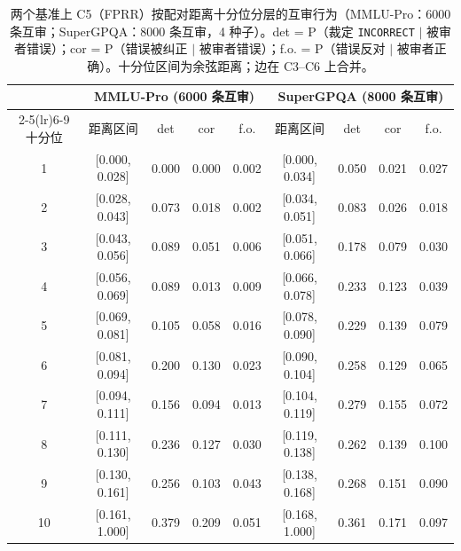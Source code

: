\documentclass[UTF8,11pt]{ctexart}
\begin{document}
\begin{table}[t]
\centering
\small
\caption{两个基准上 C5（FPRR）按配对距离十分位分层的互审行为（MMLU-Pro：6000 条互审；SuperGPQA：8000 条互审，4 种子）。det = P（裁定 \texttt{INCORRECT} $\mid$ 被审者错误）；cor = P（错误被纠正 $\mid$ 被审者错误）；f.o. = P（错误反对 $\mid$ 被审者正确）。十分位区间为余弦距离；边在 C3--C6 上合并。}
\label{tab:deciles}
\begin{tabular}{ccccccccc}
\toprule
 & \multicolumn{4}{c}{MMLU-Pro (6000 条互审)} & \multicolumn{4}{c}{SuperGPQA (8000 条互审)} \\
\cmidrule(lr){2-5}\cmidrule(lr){6-9}
十分位 & 距离区间 & det & cor & f.o. & 距离区间 & det & cor & f.o. \\
\midrule
1  & [0.000, 0.028] & 0.000 & 0.000 & 0.002 & [0.000, 0.034] & 0.050 & 0.021 & 0.027 \\
2  & [0.028, 0.043] & 0.073 & 0.018 & 0.002 & [0.034, 0.051] & 0.083 & 0.026 & 0.018 \\
3  & [0.043, 0.056] & 0.089 & 0.051 & 0.006 & [0.051, 0.066] & 0.178 & 0.079 & 0.030 \\
4  & [0.056, 0.069] & 0.089 & 0.013 & 0.009 & [0.066, 0.078] & 0.233 & 0.123 & 0.039 \\
5  & [0.069, 0.081] & 0.105 & 0.058 & 0.016 & [0.078, 0.090] & 0.229 & 0.139 & 0.079 \\
6  & [0.081, 0.094] & 0.200 & 0.130 & 0.023 & [0.090, 0.104] & 0.258 & 0.129 & 0.065 \\
7  & [0.094, 0.111] & 0.156 & 0.094 & 0.013 & [0.104, 0.119] & 0.279 & 0.155 & 0.072 \\
8  & [0.111, 0.130] & 0.236 & 0.127 & 0.030 & [0.119, 0.138] & 0.262 & 0.139 & 0.100 \\
9  & [0.130, 0.161] & 0.256 & 0.103 & 0.043 & [0.138, 0.168] & 0.268 & 0.151 & 0.090 \\
10 & [0.161, 1.000] & 0.379 & 0.209 & 0.051 & [0.168, 1.000] & 0.361 & 0.171 & 0.097 \\
\bottomrule
\end{tabular}
\end{table}
\end{document}

